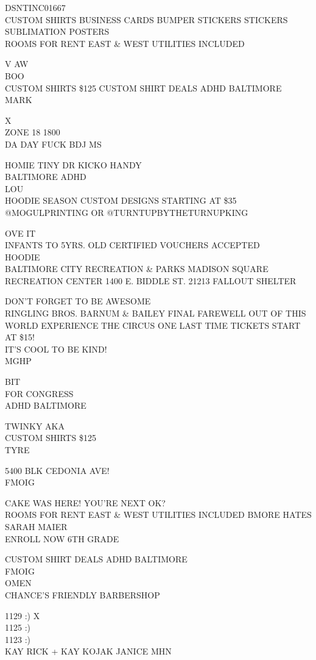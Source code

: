 \documentclass[10pt,letterpaper]{article}
\begin{document}
DSNTINC01667\\
CUSTOM SHIRTS BUSINESS CARDS BUMPER STICKERS STICKERS SUBLIMATION POSTERS\\
ROOMS FOR RENT EAST \& WEST UTILITIES INCLUDED

V AW\\
BOO\\
CUSTOM SHIRTS \$125 CUSTOM SHIRT DEALS ADHD BALTIMORE\\
MARK

X\\
ZONE 18 1800\\
DA DAY FUCK BDJ MS

HOMIE TINY DR  KICKO HANDY\\
BALTIMORE ADHD\\
LOU\\
HOODIE SEASON CUSTOM DESIGNS STARTING AT \$35 @MOGULPRINTING OR @TURNTUPBYTHETURNUPKING

OVE IT\\
INFANTS TO 5YRS. OLD CERTIFIED VOUCHERS ACCEPTED\\
HOODIE\\
BALTIMORE CITY RECREATION \& PARKS MADISON SQUARE RECREATION CENTER 1400 E. BIDDLE ST. 21213 FALLOUT SHELTER

DON'T FORGET TO BE AWESOME\\
RINGLING BROS. BARNUM \& BAILEY FINAL FAREWELL OUT OF THIS WORLD EXPERIENCE THE CIRCUS ONE LAST TIME TICKETS START AT \$15!\\
IT'S COOL TO BE KIND!\\
MGHP

BIT\\
FOR CONGRESS\\
ADHD BALTIMORE

TWINKY AKA\\
CUSTOM SHIRTS \$125\\
TYRE

5400 BLK CEDONIA AVE!\\
FMOIG

CAKE WAS HERE!  YOU'RE NEXT OK?\\
ROOMS FOR RENT EAST \& WEST UTILITIES INCLUDED BMORE HATES SARAH MAIER\\
ENROLL NOW 6TH GRADE

CUSTOM SHIRT DEALS ADHD BALTIMORE\\
FMOIG\\
OMEN\\
CHANCE'S FRIENDLY BARBERSHOP

1129 :) X\\
1125 :)\\
1123 :)\\
KAY RICK + KAY KOJAK JANICE MHN
\end{document}
